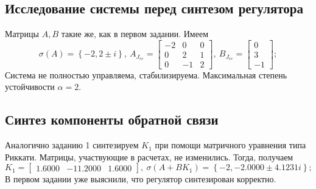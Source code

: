 \documentclass[a4paper, 12pt]{article}
\begin{document}
    \subsection{Исследование системы перед синтезом регулятора}
    Матрицы $A,B$ такие же, как в первом задании. Имеем
    $$
    \sigma\left( A \right)=\left\{ -2,2\pm i \right\},\ A_{J_{re}}=\begin{bmatrix}
        -2     &0     &0\\
        0     &2     &1\\
        0    &-1     &2
        \end{bmatrix},\ B_{J_{re}}=\begin{bmatrix}
        0\\
         3\\
        -1
        \end{bmatrix};
    $$
    Система не полностью управляема,
    стабилизируема. Максимальная степень устойчивости $\alpha=2$.


    \subsection{Синтез компоненты обратной связи}
    Аналогично заданию 1 синтезируем $K_1$ при помощи матричного
    уравнения типа Риккати. Матрицы, участвующие в расчетах, не изменились.
    Тогда, получаем
    $$
    K_1=\begin{bmatrix}
    1.6000  &-11.2000    &1.6000
    \end{bmatrix},\
    \sigma\left( A+BK_1 \right)=\left\{ -2,-2.0000 \pm 4.1231i \right\};
    $$
    В первом задании уже выяснили, что регулятор синтезирован корректно.
\end{document}

